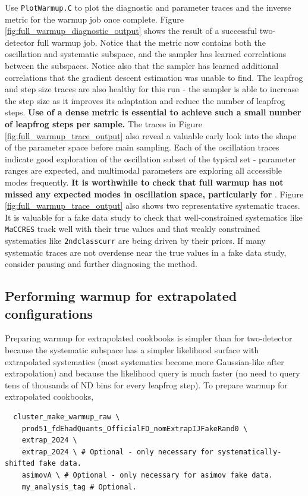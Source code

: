 \documentclass{article}
\begin{document}
Use \texttt{Plot\-Warmup\-.C} to plot the diagnostic and parameter traces and the inverse metric for the warmup job once complete. Figure \ref{fig:full_warmup_diagnostic_output} shows the result of a successful two-detector full warmup job. Notice that the metric now contains both the oscillation and systematic subspace, and the sampler has learned correlations between the subspaces. Notice also that the sampler has learned additional correlations that the gradient descent estimation was unable to find. The leapfrog and step size traces are also healthy for this run - the sampler is able to increase the step size as it improves its adaptation and reduce the number of leapfrog steps. \textbf{Use of a dense metric is essential to achieve such a small number of leapfrog steps per sample.} The traces in Figure \ref{fig:full_warmup_trace_output} also reveal a valuable early look into the shape of the parameter space before main sampling. Each of the oscillation traces indicate good exploration of the oscillation subset of the typical set - parameter ranges are expected, and multimodal parameters are exploring all accessible modes frequently. \textbf{It is worthwhile to check that full warmup has not missed any expected modes in oscillation space, particularly for \dcp}. Figure \ref{fig:full_warmup_trace_output} also shows two representative systematic traces. It is valuable for a fake data study to check that well-constrained systematics like \texttt{Ma\-CC\-RES} track well with their true values and that weakly constrained systematics like \texttt{2nd\-class\-curr} are being driven by their priors. If many systematic traces are not overdense near the true values in a fake data study, consider pausing and further diagnosing the method.

\subsection{Performing warmup for extrapolated configurations}
Preparing warmup for extrapolated cookbooks is simpler than for two-detector because the systematic subspace has a simpler likelihood surface with extrapolated systematics (most systematics become more Gaussian-like after extrapolation) and because the likelihood query is much faster (no need to query tens of thousands of ND bins for every leapfrog step). To prepare warmup for extrapolated cookbooks,
\begin{verbatim}
  cluster_make_warmup_raw \
    prod51_fdEhadQuants_OfficialFD_nomExtrapIJFakeRand0 \
    extrap_2024 \
    extrap_2024 \ # Optional - only necessary for systematically-shifted fake data.
    asimovA \ # Optional - only necessary for asimov fake data.
    my_analysis_tag # Optional.
\end{verbatim}
\end{document}
